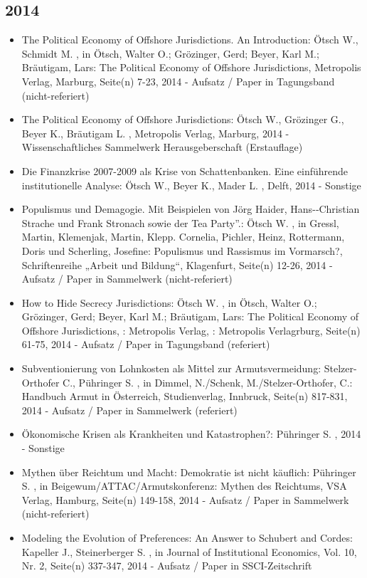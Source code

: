  \subsection{2014} 
 \begin{itemize} 
	 \item The Political Economy of Offshore Jurisdictions. An Introduction: Ötsch W., Schmidt M. , in Ötsch, Walter O.; Grözinger, Gerd; Beyer, Karl M.; Bräutigam, Lars: The Political Economy of Offshore Jurisdictions, Metropolis Verlag, Marburg, Seite(n) 7-23, 2014 - Aufsatz / Paper in Tagungsband (nicht-referiert)
	 \item The Political Economy of Offshore Jurisdictions: Ötsch W., Grözinger G., Beyer K., Bräutigam L. , Metropolis Verlag, Marburg, 2014 - Wissenschaftliches Sammelwerk Herausgeberschaft (Erstauflage)
	 \item Die Finanzkrise 2007-2009 als Krise von Schattenbanken. Eine einführende institutionelle Analyse: Ötsch W., Beyer K., Mader L. , Delft, 2014 - Sonstige
	 \item Populismus und Demagogie. Mit Beispielen von Jörg Haider, Hans-­‐Christian Strache und Frank Stronach sowie der Tea Party”.: Ötsch W. , in Gressl, Martin, Klemenjak, Martin, Klepp. Cornelia, Pichler, Heinz, Rottermann, Doris und Scherling, Josefine: Populismus und Rassismus im Vormarsch?, Schriftenreihe „Arbeit und Bildung“, Klagenfurt, Seite(n) 12-26, 2014 - Aufsatz / Paper in Sammelwerk (nicht-referiert)
	 \item How to Hide Secrecy Jurisdictions: Ötsch W. , in Ötsch, Walter O.; Grözinger, Gerd; Beyer, Karl M.; Bräutigam, Lars: The Political Economy of Offshore Jurisdictions, : Metropolis Verlag, : Metropolis Verlagrburg, Seite(n) 61-75, 2014 - Aufsatz / Paper in Tagungsband (referiert)
	 \item Subventionierung von Lohnkosten als Mittel zur Armutsvermeidung: Stelzer-Orthofer C., Pühringer S. , in Dimmel, N./Schenk, M./Stelzer-Orthofer, C.: Handbuch Armut in Österreich, Studienverlag, Innbruck, Seite(n) 817-831, 2014 - Aufsatz / Paper in Sammelwerk (referiert)
	 \item Ökonomische Krisen als Krankheiten und Katastrophen?: Pühringer S. , 2014 - Sonstige
	 \item Mythen über Reichtum und Macht: Demokratie ist nicht käuflich: Pühringer S. , in Beigewum/ATTAC/Armutskonferenz: Mythen des Reichtums, VSA Verlag, Hamburg, Seite(n) 149-158, 2014 - Aufsatz / Paper in Sammelwerk (nicht-referiert)
	 \item Modeling the Evolution of Preferences: An Answer to Schubert and Cordes: Kapeller J., Steinerberger S. , in Journal of Institutional Economics, Vol. 10, Nr. 2, Seite(n) 337-347, 2014 - Aufsatz / Paper in SSCI-Zeitschrift

\end{itemize}
